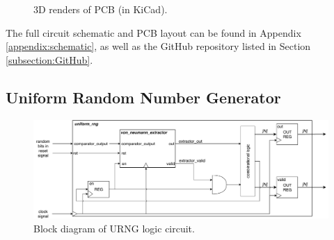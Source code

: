 \documentclass[12pt]{article}
\begin{document}
      \begin{figure}[H]
        \centering
        \caption{3D renders of PCB (in KiCad).}
        \label{fig:pcb_render}
      \end{figure}

      The full circuit schematic and PCB layout can be found in Appendix \ref{appendix:schematic}, as well as the GitHub repository listed in Section \ref{subsection:GitHub}.

      \subsection{Uniform Random Number Generator} \label{subsection:urng_impl}
        \begin{figure}[H]
          \centering
          \includegraphics[width=\textwidth]{fig/urng.pdf}
          \caption{Block diagram of URNG logic circuit.}
          \label{fig:urng_block_diagram}
        \end{figure}
\end{document}
